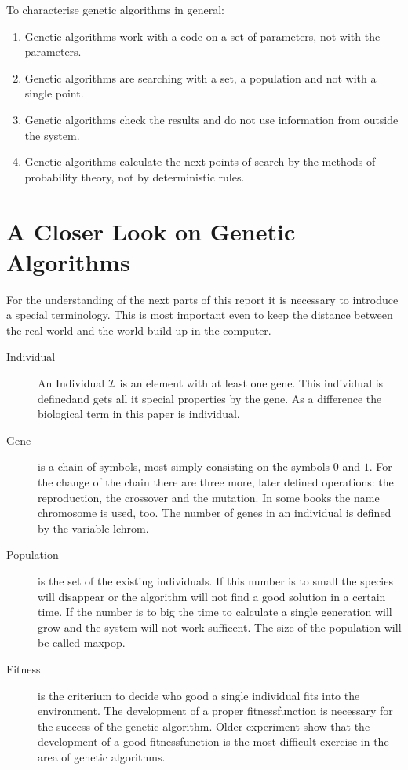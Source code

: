 To characterise genetic algorithms in general:
\begin{enumerate}
  \item Genetic algorithms work with a code on a set of parameters, not with
the parameters.
  \item Genetic algorithms are searching with a set, a population and not with
a single point.
  \item Genetic algorithms check the results and do not use information from
outside the system.
  \item Genetic algorithms calculate the next points of search by the methods
of probability theory, not by deterministic rules.
\end{enumerate}
\section{A Closer Look on Genetic Algorithms}
For the understanding of the next parts of this report it is necessary to introduce
a special terminology. This is most important even to keep the distance between
the real world and the world build up in the computer.
\begin{description}
  \item[Individual] An Individual $\cal I$ is an element with at least one gene.
This individual is definedand gets all it special properties by the gene. As a
difference the biological term in this paper is individual.
  \item[Gene] is a chain of symbols, most simply consisting on the symbols $0$
and $1$. For the change of the chain there are three more, later defined operations:
the reproduction, the crossover and the mutation. In some books the name chromosome
is used, too. The number of genes in an individual is defined by the variable
lchrom.
  \item[Population] is the set of the existing individuals. If this number is to
small the species will disappear or the algorithm will not find a good solution
in a certain time. If the number is to big the time to calculate a single generation
will grow and the system will not work sufficent. The size of the population
will be called maxpop.
  \item[Fitness] is the criterium to decide who good a single individual fits
into the environment. The development of a proper fitnessfunction is necessary
for the success of the genetic algorithm. Older experiment show that the development
of a good fitnessfunction is the most difficult exercise in the area of genetic
algorithms.
  \end{description}
